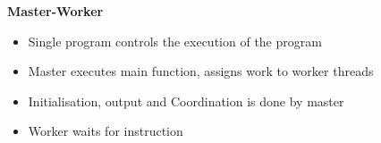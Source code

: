 \documentclass[10pt, landscape]{article}
\begin{document}
\begin{multicols}{4}
\textbf{Master-Worker}
\begin{itemize}
    \item Single program controls the execution of the program 
    \item Master executes main function, assigns work to worker threads
    \item Initialisation, output and Coordination is done by master
    \item Worker waits for instruction 
\end{itemize}





\end{multicols}
\end{document}
